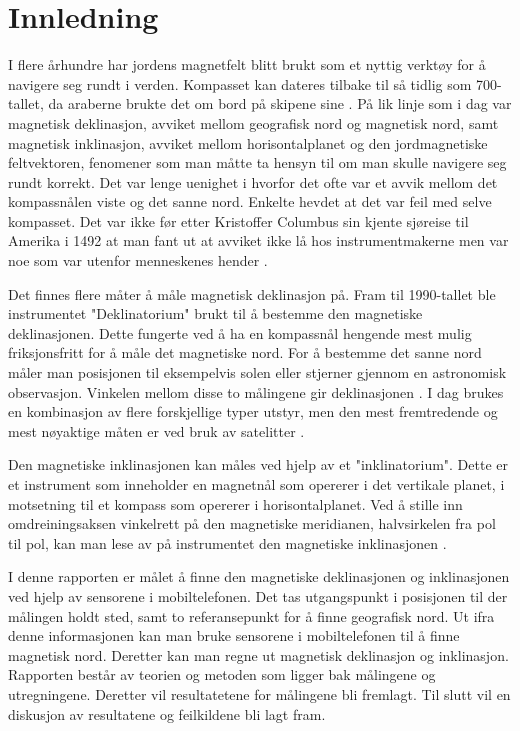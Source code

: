 \section{Innledning}

I flere århundre har jordens magnetfelt blitt brukt som et nyttig verktøy for å navigere seg rundt i verden. Kompasset kan dateres tilbake til så tidlig som 700-tallet, da araberne brukte det om bord på skipene sine \cite{kompass}. På lik linje som i dag var magnetisk deklinasjon, avviket mellom geografisk nord og magnetisk nord, samt magnetisk inklinasjon, avviket mellom horisontalplanet og den jordmagnetiske feltvektoren, fenomener som man måtte ta hensyn til om man skulle navigere seg rundt korrekt. Det var lenge uenighet i hvorfor det ofte var et avvik mellom det kompassnålen viste og det sanne nord. Enkelte hevdet at det var feil med selve kompasset. Det var ikke før etter Kristoffer Columbus sin kjente sjøreise til Amerika i 1492 at man fant ut at avviket ikke lå hos instrumentmakerne men var noe som var utenfor menneskenes hender \cite{kompass}. 

Det finnes flere måter å måle magnetisk deklinasjon på. Fram til 1990-tallet ble instrumentet "Deklinatorium" brukt til å bestemme den magnetiske deklinasjonen. Dette fungerte ved å ha en kompassnål hengende mest mulig friksjonsfritt for å måle det magnetiske nord. For å bestemme det sanne nord måler man posisjonen til eksempelvis solen eller stjerner gjennom en astronomisk observasjon. Vinkelen mellom disse to målingene gir deklinasjonen \cite{deklinatorium}. I dag brukes en kombinasjon av flere forskjellige typer utstyr, men den mest fremtredende og mest nøyaktige måten er ved bruk av satelitter \cite{World_magnetic_model}.    

Den magnetiske inklinasjonen kan måles ved hjelp av et "inklinatorium". Dette er et instrument som inneholder en magnetnål som opererer i det vertikale planet, i motsetning til et kompass som opererer i horisontalplanet. Ved å stille inn omdreiningsaksen vinkelrett på den magnetiske meridianen, halvsirkelen fra pol til pol, kan man lese av på instrumentet den magnetiske inklinasjonen \cite{inklinometer}. 

I denne rapporten er målet å finne den magnetiske deklinasjonen og inklinasjonen ved hjelp av sensorene i mobiltelefonen. Det tas utgangspunkt i posisjonen til der målingen holdt sted, samt to referansepunkt for å finne geografisk nord. Ut ifra denne informasjonen kan man bruke sensorene i mobiltelefonen til å finne magnetisk nord. Deretter kan man regne ut magnetisk deklinasjon og inklinasjon. Rapporten består av teorien og metoden som ligger bak målingene og utregningene. Deretter vil resultatetene for målingene bli fremlagt. Til slutt vil en diskusjon av resultatene og feilkildene bli lagt fram.